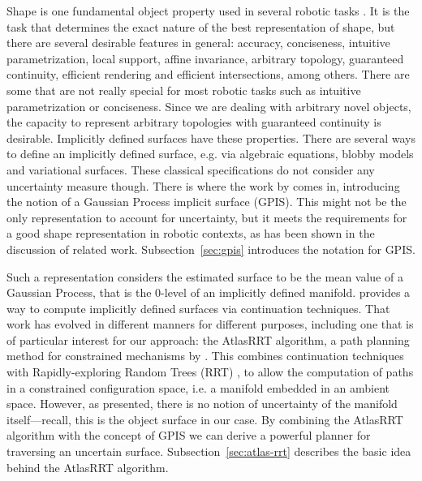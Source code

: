 
Shape is one fundamental object property used in several robotic tasks \citep{Bajcsy1989Machine}. It is the task that determines the exact nature of the best representation of shape, but there are several desirable features in general: accuracy, conciseness, intuitive parametrization, local support, affine invariance, arbitrary topology, guaranteed continuity, efficient rendering and efficient intersections, among others. There are some that are not really special for most robotic tasks such as intuitive parametrization or conciseness. Since we are dealing with arbitrary novel objects, the capacity to represent arbitrary topologies with guaranteed continuity is desirable. Implicitly defined surfaces have these properties. There are several ways to define an implicitly defined surface, e.g. via algebraic equations, blobby models and variational surfaces. These classical specifications do not consider any uncertainty measure though. There is where the work by \citet{Williams2007Gaussian} comes in, introducing the notion of a Gaussian Process implicit surface (GPIS). This might not be the only representation to account for uncertainty, but it meets the requirements for a good shape representation in robotic contexts, as has been shown in the discussion of related work. Subsection~\ref{sec:gpis} introduces the notation for GPIS.

Such a representation considers the estimated surface to be the mean value of a Gaussian Process, that is the $0$-level of an implicitly defined manifold. \citet{Henderson1993COMPUTING} provides a way to compute implicitly defined surfaces via continuation techniques. That work has evolved in different manners for different purposes, including one that is of particular interest for our approach: the AtlasRRT algorithm, a path planning method for constrained mechanisms by \citet{Jaillet2013Path}. This combines continuation techniques with Rapidly-exploring Random Trees (RRT) \citep{LaValle2011Motion}, to allow the computation of paths in a constrained configuration space, i.e. a manifold embedded in an ambient space. However, as presented, there is no notion of uncertainty of the manifold itself---recall, this is the object surface in our case. By combining the AtlasRRT algorithm with the concept of GPIS we can derive a powerful planner for traversing an uncertain surface. Subsection~\ref{sec:atlas-rrt} describes the basic idea behind the AtlasRRT algorithm.

